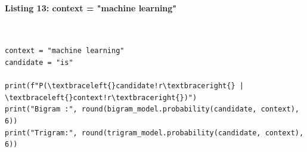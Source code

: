 \documentclass[12pt,a4paper,oneside]{report}
\begin{document}
\paragraph{Listing 13: context = "machine learning"}\mbox{}\\[-1ex]
\begin{Verbatim}[commandchars=\\\{\},breaklines=true,breakanywhere=true,fontsize=\scriptsize,frame=leftline,framesep=2mm,rulecolor=\color{gray}]
context = "machine learning"
candidate = "is"

print(f"P(\textbraceleft{}candidate!r\textbraceright{} | \textbraceleft{}context!r\textbraceright{})")
print("Bigram :", round(bigram_model.probability(candidate, context), 6))
print("Trigram:", round(trigram_model.probability(candidate, context), 6))
\end{Verbatim}
\end{document}
